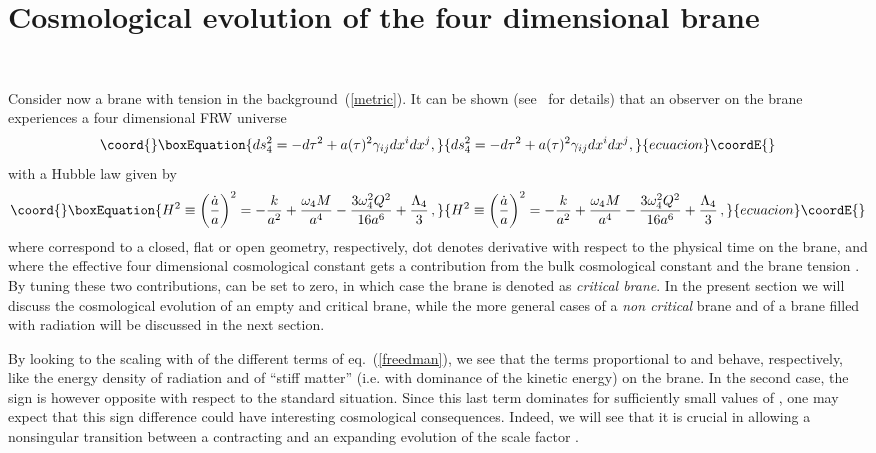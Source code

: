 \documentclass[a4paper,11pt]{article}
\begin{document}
\section{Cosmological evolution of the four dimensional brane}~\label{crit}


Consider now a brane with tension \coordHE{} in the
background~(\ref{metric}). It can be shown (see~\cite{BGG,MV,CEG,SV,GP} for
details) that an observer on the brane experiences a  four dimensional FRW
universe
%
\begin{equation}\coord{}\boxEquation{
ds_{4}^2 = -d\tau^2 + a(\tau)^2 \gamma_{ij} dx^i dx^j,
}{
ds_{4}^2 = -d\tau^2 + a(\tau)^2 \gamma_{ij} dx^i dx^j,
}{ecuacion}\coordE{}\end{equation}
%
with a Hubble law given by
%
\begin{equation}\coord{}\boxEquation{
H^2 \equiv \left( \frac{\dot{a}}{a} \right)^2 = - \frac{k}{a^2} + {\omega_{4} M\over {a^{4}}} - 
{ 3 \omega_{4}^2 Q^2\over{16 a^{6}}}+ \frac{\Lambda_4}{3} \,,
\label{freedman}
}{
H^2 \equiv \left( \frac{\dot{a}}{a} \right)^2 = - \frac{k}{a^2} + {\omega_{4} M\over {a^{4}}} - 
{ 3 \omega_{4}^2 Q^2\over{16 a^{6}}}+ \frac{\Lambda_4}{3} \,,
}{ecuacion}\coordE{}\end{equation}
%
where \coordHE{} correspond to a closed, flat or open geometry,
respectively, dot denotes derivative with respect to the physical time
\myHighlight{$\tau$}\coordHE{} on the brane, and where the effective four dimensional cosmological
constant \coordHE{} gets a contribution from the
bulk cosmological constant and the brane tension \coordHE{}. By
tuning these two contributions, \coordHE{} can be set to zero, in which
case the brane is denoted as {\it critical brane}. In the present section
we will discuss the cosmological evolution of an empty and critical brane, while the more general cases of a {\it non critical} brane and of a brane filled with radiation will be discussed in the next section.

By looking to the scaling with \coordHE{} of the different terms  of
eq.~(\ref{freedman}), we see that the terms proportional  to \coordHE{} and \coordHE{}
behave, respectively, like the energy density of  radiation and of ``stiff
matter'' (i.e. with dominance  of the kinetic energy) on the brane.  In
the second case, the sign is  however opposite with respect to the
standard situation. Since this last  term dominates for sufficiently small
values of \coordHE{}, one may expect  that this sign difference could have
interesting cosmological  consequences. Indeed, we will see that it is
crucial in allowing  a nonsingular transition between a contracting and
an  expanding evolution of the scale factor \coordHE{}. 
\end{document}
